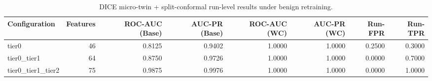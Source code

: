 \begin{table}[t]
\centering
\caption{DICE micro-twin + split-conformal run-level results under benign retraining.}
\label{tab:dice_full_overall}
\footnotesize
\begin{tabular}{lrrrrrrr}
\toprule
Configuration & Features & ROC-AUC (Base) & AUC-PR (Base) & ROC-AUC (WC) & AUC-PR (WC) & Run-FPR & Run-TPR \\
\midrule
tier0 & 46 & 0.8125 & 0.9402 & 1.0000 & 1.0000 & 0.2500 & 0.3000 \\
tier0_tier1 & 64 & 0.8750 & 0.9726 & 1.0000 & 1.0000 & 0.0000 & 0.7000 \\
tier0_tier1_tier2 & 75 & 0.9875 & 0.9976 & 1.0000 & 1.0000 & 0.0000 & 1.0000 \\
\bottomrule
\end{tabular}

\end{table}

